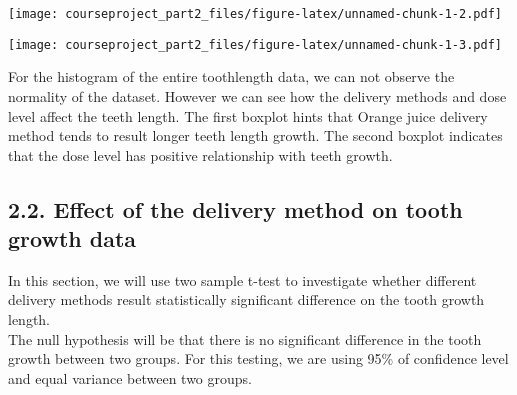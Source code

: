 \documentclass[]{article}
\newenvironment{Shaded}{\begin{snugshade}}{\end{snugshade}}
\newcommand{\KeywordTok}[1]{\textcolor[rgb]{0.13,0.29,0.53}{\textbf{#1}}}
\newcommand{\DataTypeTok}[1]{\textcolor[rgb]{0.13,0.29,0.53}{#1}}
\newcommand{\StringTok}[1]{\textcolor[rgb]{0.31,0.60,0.02}{#1}}
\newcommand{\CommentTok}[1]{\textcolor[rgb]{0.56,0.35,0.01}{\textit{#1}}}
\newcommand{\OtherTok}[1]{\textcolor[rgb]{0.56,0.35,0.01}{#1}}
\newcommand{\OperatorTok}[1]{\textcolor[rgb]{0.81,0.36,0.00}{\textbf{#1}}}
\newcommand{\NormalTok}[1]{#1}
\begin{document}
\texttt{[image: courseproject\_part2\_files/figure-latex/unnamed-chunk-1-2.pdf]}

\begin{Shaded}
\end{Shaded}

\texttt{[image: courseproject\_part2\_files/figure-latex/unnamed-chunk-1-3.pdf]}

For the histogram of the entire toothlength data, we can not observe the
normality of the dataset. However we can see how the delivery methods
and dose level affect the teeth length. The first boxplot hints that
Orange juice delivery method tends to result longer teeth length growth.
The second boxplot indicates that the dose level has positive
relationship with teeth growth.

\subsection{2.2. Effect of the delivery method on tooth growth
data}\label{effect-of-the-delivery-method-on-tooth-growth-data}

In this section, we will use two sample t-test to investigate whether
different delivery methods result statistically significant difference
on the tooth growth length.\\
The null hypothesis will be that there is no significant difference in
the tooth growth between two groups. For this testing, we are using 95\%
of confidence level and equal variance between two groups.

\begin{Shaded}
\end{Shaded}
\end{document}
